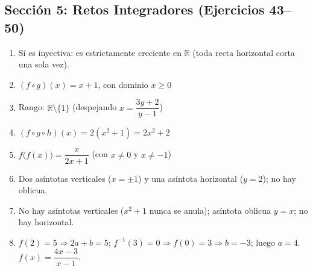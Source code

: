 \documentclass[12pt, letterpaper]{article}
\begin{document}
  \subsection*{Sección 5: Retos Integradores (Ejercicios 43--50)}
  \begin{enumerate}[resume=respuestas, leftmargin=*, label=\textbf{\arabic*.}]
    \item Sí es inyectiva: es estrictamente creciente en $\mathbb{R}$ (toda recta horizontal corta una sola vez).
    \item $(f \circ g)(x) = x + 1$, con dominio $x \ge 0$
    \item Rango: $\mathbb{R} \setminus \{1\}$ \quad (despejando $x = \dfrac{3y + 2}{y - 1}$)
    \item $(f \circ g \circ h)(x) = 2(x^2 + 1) = 2x^2 + 2$
    \item $f\big(f(x)\big) = \dfrac{x}{2x + 1}$ \quad (con $x \neq 0$ y $x \neq -1$)
    \item Dos asíntotas verticales ($x = \pm 1$) y una asíntota horizontal ($y = 2$); no hay oblicua.
    \item No hay asíntotas verticales ($x^2 + 1$ nunca se anula); asíntota oblicua $y = x$; no hay horizontal.
    \item $f(2) = 5 \Rightarrow 2a + b = 5$; \quad $f^{-1}(3) = 0 \Rightarrow f(0) = 3 \Rightarrow b = -3$; \quad luego $a = 4$. \quad $f(x) = \dfrac{4x - 3}{x - 1}$.
  \end{enumerate}
\fi
\end{document}
